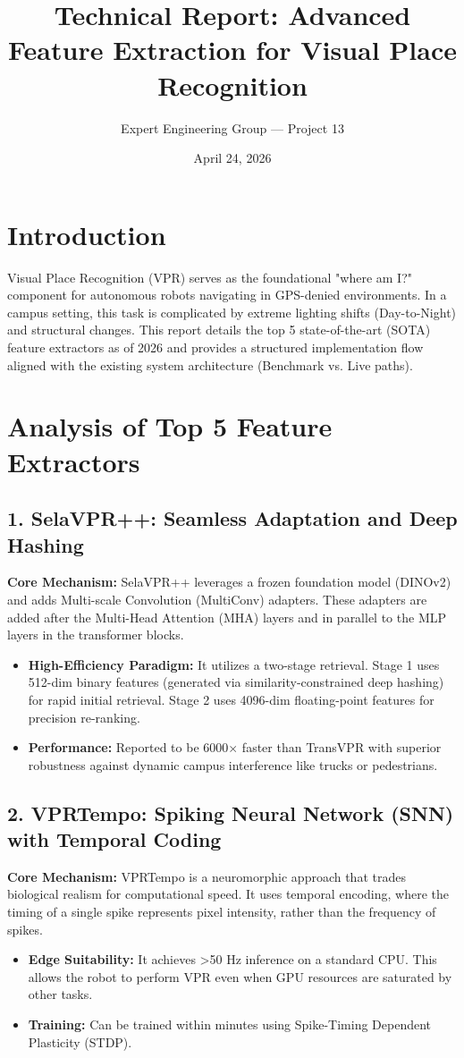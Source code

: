 \documentclass[11pt]{article}
\title{\textbf{Technical Report: Advanced Feature Extraction for Visual Place Recognition}}
\author{Expert Engineering Group --- Project 13}
\date{April 24, 2026}
\begin{document}
\maketitle

\section{Introduction}
Visual Place Recognition (VPR) serves as the foundational "where am I?" component for autonomous robots navigating in GPS-denied environments. In a campus setting, this task is complicated by extreme lighting shifts (Day-to-Night) and structural changes. This report details the top 5 state-of-the-art (SOTA) feature extractors as of 2026 and provides a structured implementation flow aligned with the existing system architecture (Benchmark vs. Live paths).

\section{Analysis of Top 5 Feature Extractors}

\subsection{1. SelaVPR++: Seamless Adaptation and Deep Hashing}
\textbf{Core Mechanism:} SelaVPR++ leverages a frozen foundation model (DINOv2) and adds Multi-scale Convolution (MultiConv) adapters. These adapters are added after the Multi-Head Attention (MHA) layers and in parallel to the MLP layers in the transformer blocks.
\begin{itemize}
    \item \textbf{High-Efficiency Paradigm:} It utilizes a two-stage retrieval. Stage 1 uses 512-dim binary features (generated via similarity-constrained deep hashing) for rapid initial retrieval. Stage 2 uses 4096-dim floating-point features for precision re-ranking.
    \item \textbf{Performance:} Reported to be 6000$\times$ faster than TransVPR with superior robustness against dynamic campus interference like trucks or pedestrians.
\end{itemize}

\subsection{2. VPRTempo: Spiking Neural Network (SNN) with Temporal Coding}
\textbf{Core Mechanism:} VPRTempo is a neuromorphic approach that trades biological realism for computational speed. It uses temporal encoding, where the timing of a single spike represents pixel intensity, rather than the frequency of spikes.
\begin{itemize}
    \item \textbf{Edge Suitability:} It achieves >50 Hz inference on a standard CPU. This allows the robot to perform VPR even when GPU resources are saturated by other tasks.
    \item \textbf{Training:} Can be trained within minutes using Spike-Timing Dependent Plasticity (STDP).
\end{itemize}
\end{document}
